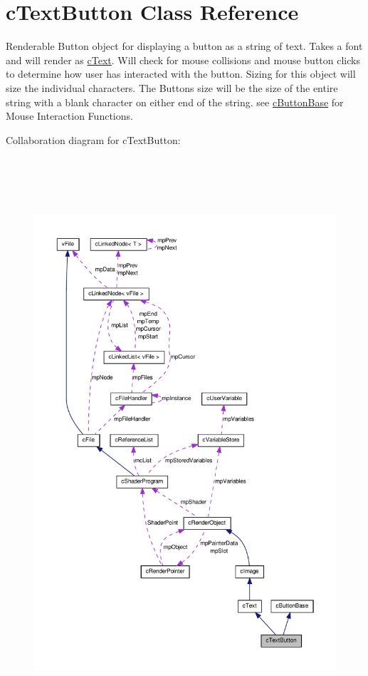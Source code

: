 \hypertarget{classc_text_button}{
\section{cTextButton Class Reference}
\label{classc_text_button}
}


Renderable Button object for displaying a button as a string of text. Takes a font and will render as \hyperlink{classc_text}{cText}. Will check for mouse collisions and mouse button clicks to determine how user has interacted with the button. Sizing for this object will size the individual characters. The Buttons size will be the size of the entire string with a blank character on either end of the string. see \hyperlink{classc_button_base}{cButtonBase} for Mouse Interaction Functions.  




Collaboration diagram for cTextButton:\nopagebreak
\begin{figure}[H]
\begin{center}
\leavevmode
\includegraphics[height=600pt]{classc_text_button__coll__graph}
\end{center}
\end{figure}
